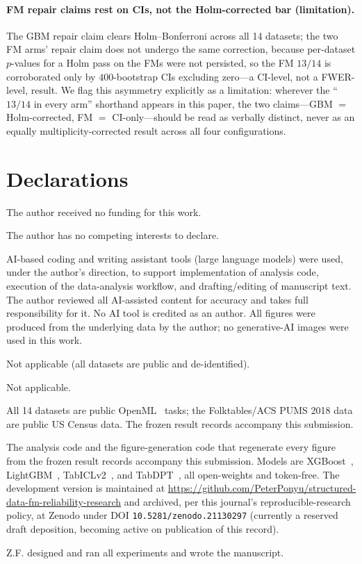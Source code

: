 \documentclass[pdflatex,sn-mathphys-num]{sn-jnl}
\begin{document}
\paragraph{FM repair claims rest on CIs, not the Holm-corrected bar (limitation).} The GBM repair claim
clears Holm--Bonferroni across all 14 datasets; the two FM arms' repair claim does not undergo the same
correction, because per-dataset $p$-values for a Holm pass on the FMs were not persisted, so the FM $13/14$
is corroborated only by $400$-bootstrap CIs excluding zero---a CI-level, not a FWER-level, result. We flag
this asymmetry explicitly as a limitation: wherever the ``$13/14$ in every arm'' shorthand appears in this
paper, the two claims---GBM $=$ Holm-corrected, FM $=$ CI-only---should be read as verbally distinct, never
as an equally multiplicity-corrected result across all four configurations.


\section*{Declarations}

 The author received no funding for this work.

 The author has no competing interests to declare.

 AI-based coding and writing assistant tools (large language
models) were used, under the author's direction, to support implementation of analysis
code, execution of the data-analysis workflow, and drafting/editing of manuscript text.
The author reviewed all AI-assisted content for accuracy and takes full responsibility
for it. No AI tool is credited as an author. All figures were produced from the underlying data by the author; no generative-AI images were used in this work.

 Not applicable (all datasets
are public and de-identified).

 Not applicable.

All 14 datasets are public OpenML~\citep{vanschoren2014openml} tasks; the
Folktables/ACS PUMS 2018 data are public US Census data. The frozen result records
accompany this submission.

The analysis code and the figure-generation code that regenerate every figure from
the frozen result records accompany this submission. Models are XGBoost~\citep{chen2016xgboost},
LightGBM~\citep{ke2017lightgbm}, TabICLv2~\citep{qu2026tabicl}, and TabDPT~\citep{ma2024tabdpt}, all
open-weights and token-free. The development version is maintained at
\url{https://github.com/PeterPonyu/structured-data-fm-reliability-research} and
archived, per this journal's reproducible-research policy, at Zenodo under DOI
\texttt{10.5281/zenodo.21130297} (currently a reserved draft deposition, becoming
active on publication of this record).

 Z.F. designed and ran all experiments and wrote the
manuscript.

\FloatBarrier

\end{document}
